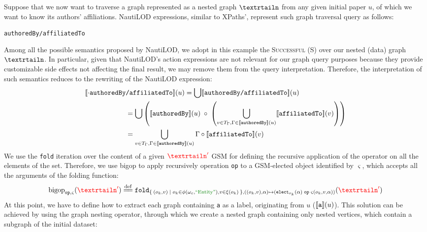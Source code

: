 \begin{example}
Suppose that we now want to traverse a graph represented as a nested graph $\nested$ from any given initial paper $u$, of which we want to know its authors' affiliations. NautiLOD expressions, similar to XPaths', represent such graph traversal query as follows:
\begin{center}
\texttt{authoredBy/affiliatedTo}
\end{center}
Among all the possible semantics proposed by NautiLOD, we adopt in this example the \textsc{Successful} (S) over our nested (data) graph $\nested$. In particular, given that NautiLOD's action expressions are not relevant for our graph query purposes because they provide customizable side effects not affecting the final result, we may remove them from the query interpretation. Therefore, the interpretation of such semantics reduces to the rewriting of the NautiLOD expression: \begin{equation}\label{eq:ExampleBigsqcup}
\begin{split}
[\! [\cdot\texttt{authoredBy}&\texttt{/affiliatedTo}]\!](u)=
\bigcup \jsem{\texttt{authoredBy/affiliatedTo}}(u)\\
&=\bigcup\left(\jsem{\texttt{authoredBy}}(u)\;\circ\;\left(\bigcup_{v\in T_\Gamma,\Gamma\in \jsem{\texttt{authoredBy}}(u)} \jsem{\texttt{affiliatedTo}}(v)\right)\right)\\
&=\bigcup_{v\in T_\Gamma,\Gamma\in\jsem{\texttt{authoredBy}}(u)}\Gamma\circ \jsem{\texttt{affiliatedTo}}(v)\\
\end{split}
\end{equation}
We use the \texttt{fold} iteration over the content of a given ${\color{red}\nested'}$ GSM for defining the recursive application of the operator on all the elements of the set. Therefore, we use \textup{bigop} to apply recursively operation \texttt{op} to a GSM-elected object identified by $\varsigma$, which accepts all the arguments of the folding function:
\[\textup{bigop}_{\texttt{op},\varsigma}({\color{red}\nested'})\eqdef\texttt{fold}_{\Set{(o_k,v)|o_k\in\phi(\omega_c,\ONTA),v\in \xi(o_k)},((o_k,v),\alpha)\mapsto (\texttt{elect}_{o_k}(\alpha)\;\texttt{op}\;\varsigma(o_k,v,\alpha))}({\color{red}\nested'})\]
At this point, we have to define how to extract each graph containing \texttt{a} as a label, originating from $u$ ($[\! [\texttt{a}]\!](u)$). This solution can be achieved by using the graph nesting operator, through which we create a nested graph containing only nested vertices, which contain a subgraph of the initial dataset: 

\end{example}
